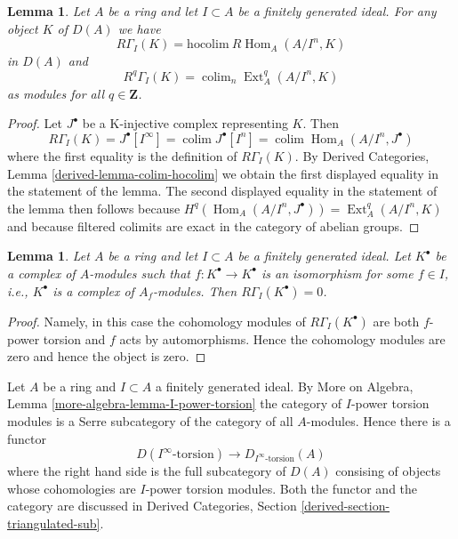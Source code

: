 \documentclass{stacks-project}
\theoremstyle{plain}
\newtheorem{lemma}[subsection]{Lemma}
\theoremstyle{definition}
\theoremstyle{remark}
\numberwithin{equation}{subsection}
\def\colim{\mathop{\mathrm{colim}}\nolimits}
\def\Hom{\mathop{\mathrm{Hom}}\nolimits}
\def\Ext{\mathop{\mathrm{Ext}}\nolimits}
\begin{document}
\begin{lemma}
\label{lemma-local-cohomology-ext}
Let $A$ be a ring and let $I \subset A$ be a finitely generated ideal.
For any object $K$ of $D(A)$ we have
$$
R\Gamma_I(K) = \text{hocolim}\ R\Hom_A(A/I^n, K)
$$
in $D(A)$ and
$$
R^q\Gamma_I(K) = \colim_n \Ext_A^q(A/I^n, K)
$$
as modules for all $q \in \mathbf{Z}$.
\end{lemma}

\begin{proof}
Let $J^\bullet$ be a K-injective complex representing $K$. Then
$$
R\Gamma_I(K) = J^\bullet[I^\infty] = \colim J^\bullet[I^n] =
\colim \Hom_A(A/I^n, J^\bullet)
$$
where the first equality is the definition of $R\Gamma_I(K)$.
By Derived Categories, Lemma \ref{derived-lemma-colim-hocolim}
we obtain the first displayed equality in the statement of the lemma.
The second displayed equality in the statement of the lemma then
follows because $H^q(\Hom_A(A/I^n, J^\bullet)) = \Ext^q_A(A/I^n, K)$
and because filtered colimits are exact in the category of abelian
groups.
\end{proof}

\begin{lemma}
\label{lemma-bad-local-cohomology-vanishes}
Let $A$ be a ring and let $I \subset A$ be a finitely generated ideal.
Let $K^\bullet$ be a complex of $A$-modules such that
$f : K^\bullet \to K^\bullet$ is an isomorphism for some
$f \in I$, i.e., $K^\bullet$ is a complex of $A_f$-modules. Then
$R\Gamma_I(K^\bullet) = 0$.
\end{lemma}

\begin{proof}
Namely, in this case the cohomology modules of $R\Gamma_I(K^\bullet)$
are both $f$-power torsion and $f$ acts by automorphisms. Hence the
cohomology modules are zero and hence the object is zero.
\end{proof}

\noindent
Let $A$ be a ring and $I \subset A$ a finitely generated ideal.
By More on Algebra, Lemma \ref{more-algebra-lemma-I-power-torsion}
the category of $I$-power torsion modules is a Serre subcategory
of the category of all $A$-modules. Hence there is a functor
\begin{equation}
\label{equation-compare-torsion}
D(I^\infty\text{-torsion}) \longrightarrow D_{I^\infty\text{-torsion}}(A)
\end{equation}
where the right hand side is the full subcategory of $D(A)$
consising of objects whose cohomologies are $I$-power torsion modules.
Both the functor and the category are discussed in
Derived Categories, Section \ref{derived-section-triangulated-sub}.
\end{document}

